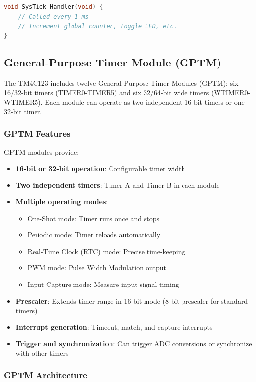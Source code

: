\begin{lstlisting}[language=C]
void SysTick_Handler(void) {
    // Called every 1 ms
    // Increment global counter, toggle LED, etc.
}
\end{lstlisting}

\subsection{General-Purpose Timer Module (GPTM)}

The TM4C123 includes twelve General-Purpose Timer Modules (GPTM): six 16/32-bit timers (TIMER0-TIMER5) and six 32/64-bit wide timers (WTIMER0-WTIMER5). Each module can operate as two independent 16-bit timers or one 32-bit timer.

\subsubsection{GPTM Features}

GPTM modules provide:
\begin{itemize}[nosep]
  \item \textbf{16-bit or 32-bit operation}: Configurable timer width
  \item \textbf{Two independent timers}: Timer A and Timer B in each module
  \item \textbf{Multiple operating modes}:
    \begin{itemize}[nosep]
      \item One-Shot mode: Timer runs once and stops
      \item Periodic mode: Timer reloads automatically
      \item Real-Time Clock (RTC) mode: Precise time-keeping
      \item PWM mode: Pulse Width Modulation output
      \item Input Capture mode: Measure input signal timing
    \end{itemize}
  \item \textbf{Prescaler}: Extends timer range in 16-bit mode (8-bit prescaler for standard timers)
  \item \textbf{Interrupt generation}: Timeout, match, and capture interrupts
  \item \textbf{Trigger and synchronization}: Can trigger ADC conversions or synchronize with other timers
\end{itemize}

\subsubsection{GPTM Architecture}

